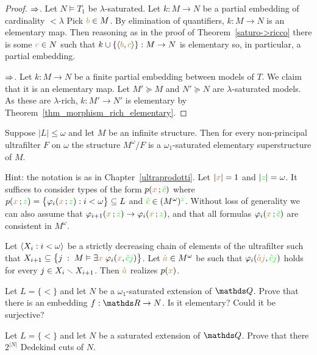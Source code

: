 \begin{proof}$\Rightarrow$.
  Let $N\models T_1$ be $\lambda\mbox{-}$saturated.
  Let $k:M\to N$ be a partial embedding of cardinality $<\lambda$
  Pick ${\color{brown} b}\in M$.
  By elimination of quantifiers, $k:M\to N$ is an elementary map.
  Then reasoning as in the proof of Theorem~\ref{saturo->ricco} there is some ${\color{brown} c}\in N$ such that $k\cup \{\langle{\color{brown}b},{\color{brown} c}\rangle\}:M\to N$ is elementary so, in particular, a partial embedding.

  $\Rightarrow$. Let $k:M\to N$ be a finite partial embedding between models of $T$. We claim that it is an elementary map. Let $M'\succeq M$ and $N'\succeq N$ are $\lambda$-saturated models. As these are $\lambda$-rich, $k:M'\to N'$ is elementary by Theorem~\ref{thm_morphism_rich_elementary}.
\end{proof}

\begin{exercise}
  Suppose $|L|\le\omega$ and let $M$ be an infinite structure. Then for every non-principal ultrafilter $F$ on $\omega$ the structure $M^\omega/F$ is a $\omega_1$-saturated elementary superstructure of $M$.

  Hint: the notation is as in Chapter~\ref{ultraprodotti}. Let $|{\color{brown} x}|=1$ and 
  $|{\color{green} z}|=\omega$. It suffices to consider types of the form $p({\color{brown} x}\,;{\color{green}\hat c})$ where $p({\color{brown} x}\,;{\color{green} z})=\big\{\varphi_i({\color{brown} x}\,;{\color{green} z}):i<\omega\big\}\subseteq L$ and ${\color{green}\hat c}\in(M^\omega)^{\color{green} z}$. Without loss of generality we can also assume that $\varphi_{i+1}({\color{brown} x}\,;{\color{green} z})\rightarrow\varphi_i({\color{brown} x}\,;{\color{green} z})$, and that all formulas $\varphi_i({\color{brown} x}\,;{\color{green}\hat c})$ are consistent in $M^\omega$. 

  Let $\langle X_i:i<\omega\rangle$ be a strictly decreasing chain of elements of the ultrafilter such that  $X_{i+1}\subseteq\big\{j\;:\;M\vDash\exists{\color{brown}x}\;\varphi_i({\color{brown} x},{\color{green}\hat cj})\big\}$. Let ${\color{brown}\hat a}\in M^\omega$ be such that  $\varphi_i({\color{brown}\hat aj},{\color{green}\hat cj})$ holds for every $j\in X_i\smallsetminus X_{i+1}$. Then ${\color{brown}\hat a}$ realizes $p({\color{brown} x})$.
\end{exercise}
  
\begin{exercise}
  Let $L = \{<\}$ and let $N$ be a $\omega_1$-saturated extension of $\QQ$.
  Prove that there is an embedding $f:\RR \to  N$.
  Is it elementary?
  Could it be surjective?
\end{exercise}

\begin{exercise}
  Let $L = \{<\}$ and let $N$ be a saturated extension of $\QQ$.
  Prove that there $2^{|N|}$ Dedekind cuts of $N$.
\end{exercise}

